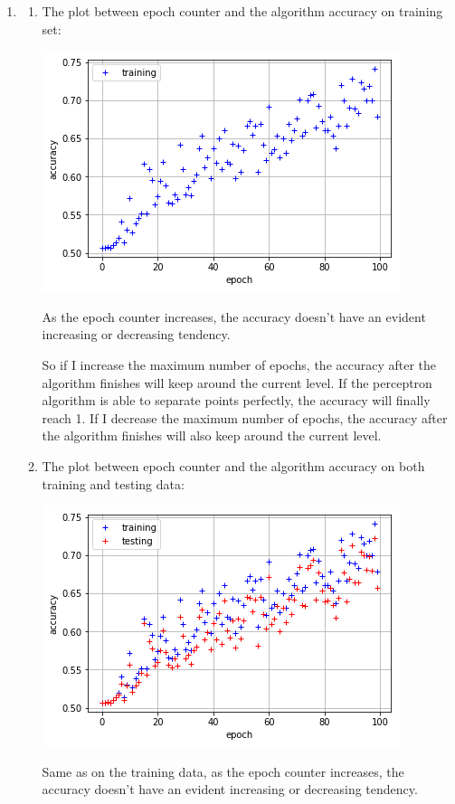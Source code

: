 \documentclass[paper=letter, fontsize=12pt]{article}
\begin{document}
\begin{enumerate}
\item 
\begin{enumerate}
	\item 
	The plot between epoch counter and the algorithm accuracy on training set:
	
	\includegraphics[scale=0.5]{p2q1a.png}
	
	As the epoch counter increases, the accuracy doesn't have an evident increasing or decreasing tendency.
	
	So if I increase the maximum number of epochs, the accuracy after the algorithm finishes will keep around the current level. If the perceptron algorithm is able to separate points perfectly, the accuracy will finally reach 1. If I decrease the maximum number of epochs, the accuracy after the algorithm finishes will also keep around the current level.
	
	\item 
	The plot between epoch counter and the algorithm accuracy on both training and testing data:
	
	\includegraphics[scale=0.5]{p2q1b.png}
	
	Same as on the training data, as the epoch counter increases, the accuracy doesn't have an evident increasing or decreasing tendency.
	

\end{enumerate}
\end{enumerate}
\end{document}
